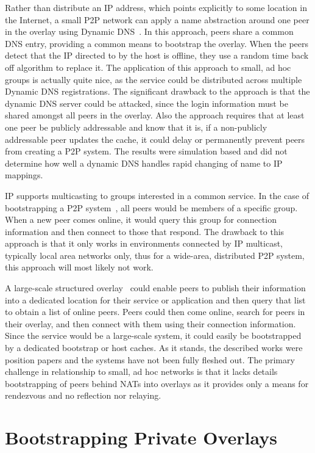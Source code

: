 \documentclass[conference]{IEEEtran}
\begin{document}
Rather than distribute an IP address, which points explicitly to some location
in the Internet, a small P2P network can apply a name abstraction around one
peer in the overlay using Dynamic DNS~\cite{bootstrapping_ddns}.  In this
approach, peers share a common DNS entry, providing a common means to bootstrap
the overlay.  When the peers detect that the IP directed to by the host is
offline, they use a random time back off algorithm to replace it.  The
application of this approach to small, ad hoc groups is actually quite nice, as
the service could be distributed across multiple Dynamic DNS registrations.
The significant drawback to the approach is that the dynamic DNS server could
be attacked, since the login information must be shared amongst all peers in
the overlay.  Also the approach requires that at least one peer be publicly
addressable and know that it is, if a non-publicly addressable peer updates the
cache, it could delay or permanently prevent peers from creating a P2P system.
The results were simulation based and did not determine how well a dynamic DNS
handles rapid changing of name to IP mappings.

IP supports multicasting to groups interested in a common service.  In the case
of bootstrapping a P2P system~\cite{pastry, locality_aware}, all peers would be
members of a specific group.  When a new peer comes online, it would query this
group for connection information and then connect to those that respond.  The
drawback to this approach is that it only works in environments connected by IP
multicast, typically local area networks only, thus for a wide-area,
distributed P2P system, this approach will most likely not work.

A large-scale structured overlay~\cite{one_ring, p2p_bootstrap} could enable
peers to publish their information into a dedicated location for their service
or application and then query that list to obtain a list of online peers.
Peers could then come online, search for peers in their overlay, and then
connect with them using their connection information.  Since the service would
be a large-scale system, it could easily be bootstrapped by a dedicated
bootstrap or host caches.  As it stands, the described works were position
papers and the systems have not been fully fleshed out.  The primary challenge
in relationship to small, ad hoc networks is that it lacks details
bootstrapping of peers behind NATs into overlays as it provides only a means
for rendezvous and no reflection nor relaying.

\section{Bootstrapping Private Overlays}
\label{our_contribution}
\end{document}
